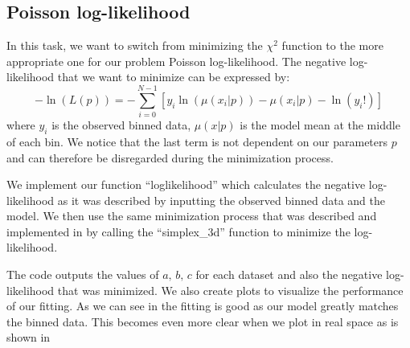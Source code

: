 \documentclass[a4paper,10pt]{article}
\begin{document}
\subsection{Poisson log-likelihood}
\label{chap:poisson}

In this task, we want to switch from minimizing the $\chi^2$ function to the more appropriate one for our problem Poisson log-likelihood. The negative log-likelihood that we want to minimize can be expressed by:
\begin{equation}
  -\ln(L(p))=-\sum^{N-1}_{i=0}[y_i \ln(\mu(x_i|p))-\mu(x_i|p)- \ln(y_i!)]
\end{equation}
where $y_i$ is the observed binned data, $\mu(x|p)$ is the model mean at the middle of each bin. We notice that the last term is not dependent on our parameters $p$ and can therefore be disregarded during the minimization process. 

We implement our function ``loglikelihood'' which calculates the negative log-likelihood as it was described by inputting the observed binned data and the model. We then use the same minimization process that was described and implemented in  by calling the ``simplex\_3d'' function to minimize the log-likelihood. 



The code outputs the values of $a,\,b,\,c$ for each dataset and also the negative log-likelihood that was minimized. We also create plots to visualize the performance of our fitting. As we can see in  the fitting is good as our model greatly matches the binned data. This becomes even more clear when we plot in real space as is shown in 
\end{document}
